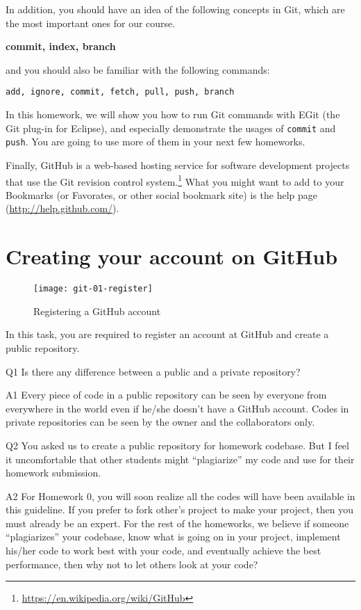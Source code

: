 In addition, you should have an idea of the following concepts in Git, which are the most important ones for our course.

\begin{center}
\textbf{commit, index, branch}
\end{center}

\noindent and you should also be familiar with the following commands:

\begin{center}
\texttt{add, ignore, commit, fetch, pull, push, branch}
\end{center}

In this homework, we will show you how to run Git commands with EGit (the Git plug-in for Eclipse), and especially demonstrate the usages of \texttt{commit} and \texttt{push}. You are going to use more of them in your next few homeworks.

Finally, GitHub is a web-based hosting service for software development projects that use the Git revision control system.\footnote{\url{https://en.wikipedia.org/wiki/GitHub}} What you might want to add to your Bookmarks (or Favorates, or other social bookmark site) is the help page (\url{http://help.github.com/}).

\section{Creating your account on GitHub}

\begin{figure}[t]
\centering
\texttt{[image: git-01-register]}
\caption{Registering a GitHub account\label{git-01-register}}
\end{figure}

In this task, you are required to register an account at GitHub and create a public repository.

\begin{qa}
\item[Q1] Is there any difference between a public and a private repository?
\item[A1] Every piece of code in a public repository can be seen by everyone from everywhere in the world even if he/she doesn't have a GitHub account. Codes in private repositories can be seen by the owner and the collaborators only.
\item[Q2] You asked us to create a public repository for homework codebase. But I feel it uncomfortable that other students might ``plagiarize'' my code and use for their homework submission.
\item[A2] For Homework 0, you will soon realize all the codes will have been available in this guideline. If you prefer to fork other's project to make your project, then you must already be an expert. For the rest of the homeworks, we believe if someone ``plagiarizes'' your codebase, know what is going on in your project, implement his/her code to work best with your code, and eventually achieve the best performance, then why not to let others look at your code?
\end{qa}

